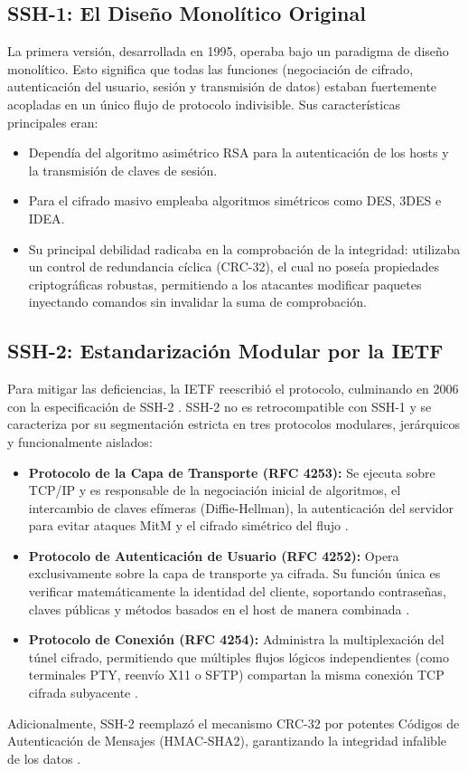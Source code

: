 \documentclass[a4paper,12pt]{article}
\begin{document}
\subsection*{SSH-1: El Diseño Monolítico Original}
La primera versión, desarrollada en 1995, operaba bajo un paradigma de diseño monolítico. Esto significa que todas las funciones (negociación de cifrado, autenticación del usuario, sesión y transmisión de datos) estaban fuertemente acopladas en un único flujo de protocolo indivisible. Sus características principales eran:
\begin{itemize}
    \item Dependía del algoritmo asimétrico RSA para la autenticación de los hosts y la transmisión de claves de sesión.
    \item Para el cifrado masivo empleaba algoritmos simétricos como DES, 3DES e IDEA.
    \item Su principal debilidad radicaba en la comprobación de la integridad: utilizaba un control de redundancia cíclica (CRC-32), el cual no poseía propiedades criptográficas robustas, permitiendo a los atacantes modificar paquetes inyectando comandos sin invalidar la suma de comprobación.
\end{itemize}

\subsection*{SSH-2: Estandarización Modular por la IETF}
Para mitigar las deficiencias, la IETF reescribió el protocolo, culminando en 2006 con la especificación de SSH-2 \cite{rfc4251_ietf}. SSH-2 no es retrocompatible con SSH-1 y se caracteriza por su segmentación estricta en tres protocolos modulares, jerárquicos y funcionalmente aislados:
\begin{itemize}
    \item \textbf{Protocolo de la Capa de Transporte (RFC 4253):} Se ejecuta sobre TCP/IP y es responsable de la negociación inicial de algoritmos, el intercambio de claves efímeras (Diffie-Hellman), la autenticación del servidor para evitar ataques MitM y el cifrado simétrico del flujo \cite{rfc4253_ietf}.
    \item \textbf{Protocolo de Autenticación de Usuario (RFC 4252):} Opera exclusivamente sobre la capa de transporte ya cifrada. Su función única es verificar matemáticamente la identidad del cliente, soportando contraseñas, claves públicas y métodos basados en el host de manera combinada \cite{rfc4252_ietf}.
    \item \textbf{Protocolo de Conexión (RFC 4254):} Administra la multiplexación del túnel cifrado, permitiendo que múltiples flujos lógicos independientes (como terminales PTY, reenvío X11 o SFTP) compartan la misma conexión TCP cifrada subyacente \cite{rfc4254_ietf}.
\end{itemize}
Adicionalmente, SSH-2 reemplazó el mecanismo CRC-32 por potentes Códigos de Autenticación de Mensajes (HMAC-SHA2), garantizando la integridad infalible de los datos \cite{rfc4253_ietf}.
\end{document}
